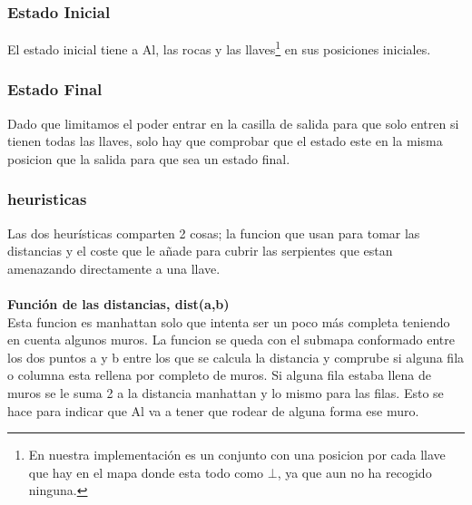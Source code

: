 \documentclass[11pt,spanish]{article}
\begin{document}
		\subsubsection{Estado Inicial}
			El estado inicial tiene a Al, las rocas y las llaves\footnote{En nuestra implementación es un conjunto con una posicion por cada llave que hay en el mapa donde esta todo como $\bot$, ya que aun no ha recogido ninguna.} en sus posiciones iniciales.
		\subsubsection{Estado Final}
			Dado que limitamos el poder entrar en la casilla de salida para que solo entren si tienen todas las llaves, solo hay que comprobar que el estado este en la misma posicion que la salida para que sea un estado final.
		\subsubsection{heuristicas}
		Las dos heurísticas comparten 2 cosas; la funcion que usan para tomar las distancias y el coste que le añade para cubrir las serpientes que estan amenazando directamente a una llave.\\
			\\
			\textbf{Función de las distancias, dist(a,b)}\\
			Esta funcion es manhattan solo que intenta ser un poco más completa teniendo en cuenta algunos muros. La funcion se queda con el submapa conformado entre los dos puntos a y b entre los que se calcula la distancia y comprube si alguna fila o columna esta rellena por completo de muros. Si alguna fila estaba llena de muros se le suma 2 a la distancia manhattan y lo mismo para las filas. Esto se hace para indicar que Al va a tener que rodear de alguna forma ese muro.
\end{document}
